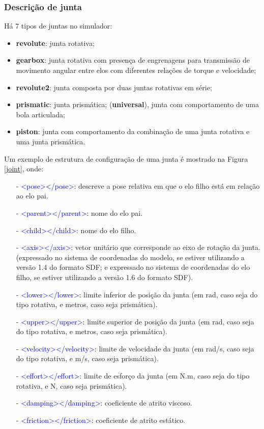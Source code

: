 \subsubsection{Descrição de junta} 

Há 7 tipos de juntas no simulador: 

\begin{itemize}
\item \textbf{revolute}: junta rotativa; 
\item \textbf{gearbox}: junta rotativa com presença de engrenagens para transmissão de movimento angular entre elos com diferentes relações de torque e velocidade; 
\item \textbf{revolute2}: junta composta por duas juntas rotativas em série; 
\item \textbf{prismatic}: junta prismática; (\textbf{universal}), junta com comportamento de uma bola articulada; 
\item \textbf{piston}: junta com comportamento da combinação de uma junta rotativa e uma junta prismática.
\end{itemize}

Um exemplo de estrutura de configuração de uma junta é mostrado na Figura \ref{joint}, onde:
\begin{itemize}
\setlength{\itemsep}{1pt}
\setlength{\parskip}{0pt}
\setlength{\parsep}{0pt}
\item[-] \textcolor{blue}{<pose></pose>}: descreve a pose relativa em que o elo filho está em relação ao elo pai.
\item[-] \textcolor{blue}{<parent></parent>}: nome do elo pai.
\item[-] \textcolor{blue}{<child></child>}: nome do elo filho.
\item[-] \textcolor{blue}{<axis></axis>}: vetor unitário que corresponde ao eixo de rotação da junta. (expressado no sistema de coordenadas do modelo, se estiver utilizando a versão 1.4 do formato SDF; e expressado no sistema de coordenadas do elo filho, se estiver utilizando a versão 1.6 do formato SDF).
\item[-] \textcolor{blue}{<lower></lower>}: limite inferior de posição da junta (em rad, caso seja do tipo rotativa, e metros, caso seja prismática).
\item[-] \textcolor{blue}{<upper></upper>}: limite superior de posição da junta (em rad, caso seja do tipo rotativa, e metros, caso seja prismática).
\item[-] \textcolor{blue}{<velocity></velocity>}: limite de velocidade da junta (em rad/s, caso seja do tipo rotativa, e m/s, caso seja prismática).
\item[-] \textcolor{blue}{<effort></effort>}: limite de esforço da junta (em N.m, caso seja do tipo rotativa, e N, caso seja prismática).
\item[-] \textcolor{blue}{<damping></damping>}: coeficiente de atrito viscoso.
\item[-] \textcolor{blue}{<friction></friction>}: coeficiente de atrito estático.
\end{itemize}


